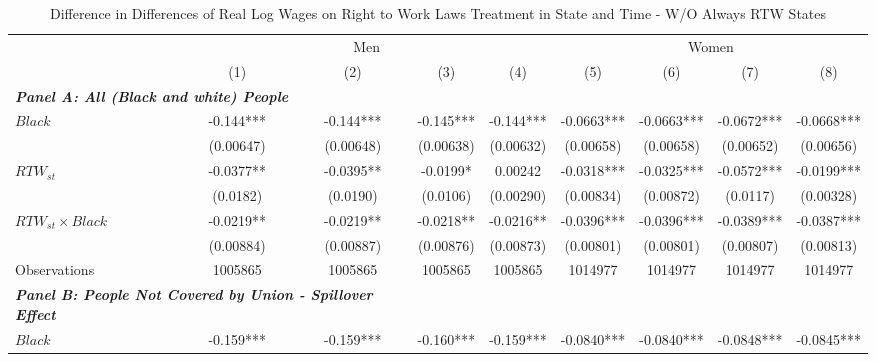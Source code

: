 \begin{table}[ht!]\centering
\def\sym#1{\ifmmode^{#1}\else\(^{#1}\)\fi}
\caption{Difference in Differences of Real Log Wages on Right to Work Laws Treatment in State and Time - W/O Always RTW States}\label{tab:wagstagdid-wo-ar2w}
\fontsize{10}{11}\selectfont
\begin{tabular}{l*{8}{c}}
\hline
&\multicolumn{4}{c}{Men}                                        &\multicolumn{4}{c}{Women}                                      \\\cmidrule(lr){2-5}\cmidrule(lr){6-9}
&\multicolumn{1}{c}{(1)}   &\multicolumn{1}{c}{(2)}   &\multicolumn{1}{c}{(3)}   &\multicolumn{1}{c}{(4)}   &\multicolumn{1}{c}{(5)}   &\multicolumn{1}{c}{(6)}   &\multicolumn{1}{c}{(7)}   &\multicolumn{1}{c}{(8)}   \\
\hline
\multicolumn{3}{l}{\linebreak \textbf{\textit{Panel A: All (Black and white) People}}} \\
$ Black $           &      -0.144***&      -0.144***&      -0.145***&      -0.144***&     -0.0663***&     -0.0663***&     -0.0672***&     -0.0668***\\
&   (0.00647)   &   (0.00648)   &   (0.00638)   &   (0.00632)   &   (0.00658)   &   (0.00658)   &   (0.00652)   &   (0.00656)   \\
[1em]
$ RTW_{st} $      &     -0.0377** &     -0.0395** &     -0.0199*  &     0.00242   &     -0.0318***&     -0.0325***&     -0.0572***&     -0.0199***\\
&    (0.0182)   &    (0.0190)   &    (0.0106)   &   (0.00290)   &   (0.00834)   &   (0.00872)   &    (0.0117)   &   (0.00328)   \\
[1em]
$ RTW_{st} \times Black $&     -0.0219** &     -0.0219** &     -0.0218** &     -0.0216** &     -0.0396***&     -0.0396***&     -0.0389***&     -0.0387***\\
&   (0.00884)   &   (0.00887)   &   (0.00876)   &   (0.00873)   &   (0.00801)   &   (0.00801)   &   (0.00807)   &   (0.00813)   \\
\hline
Observations        &     1005865   &     1005865   &     1005865   &     1005865   &     1014977   &     1014977   &     1014977   &     1014977   \\
\hline
\multicolumn{3}{l}{\linebreak \textbf{\textit{Panel B: People Not Covered by Union - Spillover Effect}}} \\
$ Black $           &      -0.159***&      -0.159***&      -0.160***&      -0.159***&     -0.0840***&     -0.0840***&     -0.0848***&     -0.0845***\\

\end{tabular}
\end{table}
